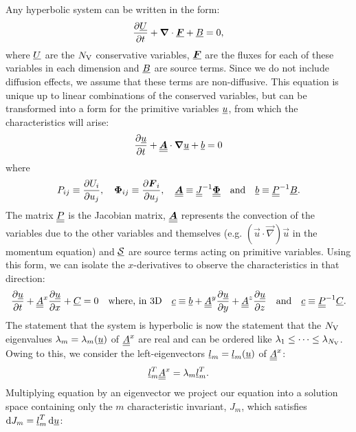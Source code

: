 Any hyperbolic system can be written in the form:
\begin{equation} \label{eqn:hyp-source}
\pdv{\und{U}}{t} + \vec{\nabla}\cdot\und{\vec{F}} + \und{B} = 0,
\end{equation}
where $\und{U}$ are the $N_\rm{V}$ conservative variables, $\und{\vec{F}}$ are the fluxes for each of these variables in each dimension and $\und{B}$ are source terms. Since we do not include diffusion effects, we assume that these terms are non-diffusive. %
This equation is unique up to linear combinations of the conserved variables, but can be transformed into a form for the primitive variables $\und{u}$, from which the characteristics will arise:
\begin{equation}
\pdv{\und{u}}{t} + \undt{\vec{A}} \cdot \vec{\nabla} \und{u} + \und{b} = 0
\end{equation}
where
\begin{equation}
P_{ij} \equiv \pdv{U_i}{u_j},
\quad
\vec{\Phi}_{ij} \equiv \pdv{\vec{F}_i}{u_j},
\quad
\undt{\vec{A}} \equiv \undt{J}^{-1}\undt{\vec{\Phi}}
\quad \text{and} \quad
\und{b} \equiv \undt{{P}}^{-1}\und{B}.
\end{equation}
The matrix $\undt{P}$ is the Jacobian matrix, $\undt{\vec{A}}$ represents the convection of the variables due to the other variables and themselves (e.g. $(\vec{u} \cdot \vec{\nabla})\vec{u}$ in the momentum equation) and $\und{\cl{S}}$ are source terms acting on primitive variables. Using this form, we can isolate the $x$-derivatives to observe the characteristics in that direction:
\begin{equation} \label{eqn:with_A}
\pdv{\und{u}}{t} + \undt{A}^x \pdv{\und{u}}{x} + \und{C} = 0
\quad \text{where, in 3D} \quad
\und{c} \equiv \und{b} + \undt{A}^y \pdv{\und{u}}{y} + \undt{A}^z \pdv{\und{u}}{z}
\quad \text{and} \quad
\und{c} \equiv \undt{P}^{-1} \und{C}.
\end{equation}
The statement that the system is hyperbolic is now the statement that the $N_\rm{V}$ eigenvalues $\l_m = \l_m(\und{u})$ of $\undt{A}^x$ are real and can be ordered like $\l_1 \leq \dots \leq \l_{N_\rm{V}}$. Owing to this, we consider the left-eigenvectors $\und{l}_m = \und{l}_m(\und{u})$ of $\undt{A}^x$:
\begin{equation}
\und{l}_m^T \undt{A}^x = \l_m \und{l}_m^T.
\end{equation}
Multiplying equation  by an eigenvector we project our equation into a solution space containing only the $m$ characteristic invariant, $J_m$, which satisfies $\dd{J_m} = \und{l}_m^T \dd{\und{u}}$:
